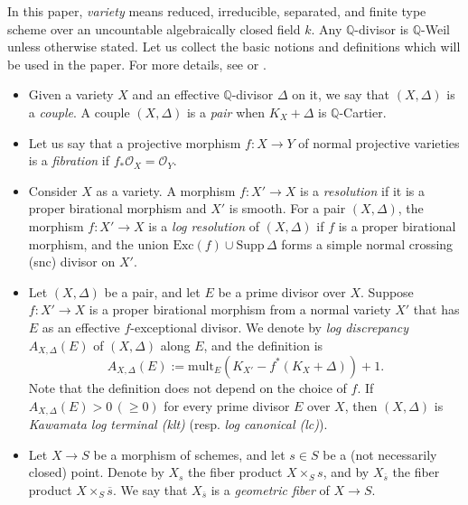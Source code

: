 \documentclass[a4paper,12pt]{amsart}
\theoremstyle{definition} %
\theoremstyle{remark}
\numberwithin{equation}{section}
\newcommand{\Q}{\mathbb{Q}}
\begin{document}
In this paper, \emph{variety} means reduced, irreducible, separated, and finite type scheme over an uncountable algebraically closed field $k$. Any $\Q$-divisor is $\Q$-Weil unless otherwise stated. Let us collect the basic notions and definitions which will be used in the paper. For more details, see \cite{KM98} or \cite{Fuj17}.

\begin{itemize}
\item Given a variety $X$ and an effective $\Q$-divisor $\Delta$ on it, we say that $(X,\Delta)$ is a \emph{couple}. A couple $(X,\Delta)$ is a \emph{pair} when $K_X+\Delta$ is $\Q$-Cartier.
\item Let us say that a projective morphism $f:X\to Y$ of normal projective varieties is a \emph{fibration} if $f_*\mathcal{O}_X=\mathcal{O}_Y$.
\item Consider $X$ as a variety. A morphism $f: X'\to X$ is a \emph{resolution} if it is a proper birational morphism and $X'$ is smooth. For a pair $(X, \Delta)$, the morphism $f:X'\to X$ is a \emph{log resolution} of $(X,\Delta)$ if $f$ is a proper birational morphism, and the union $\mathrm{Exc}(f) \cup \mathrm{Supp}\, \Delta$ forms a simple normal crossing (snc) divisor on $X'$.
\item Let $(X,\Delta)$ be a pair, and let $E$ be a prime divisor over $X$. Suppose $f:X'\to X$ is a proper birational morphism from a normal variety $X'$ that has $E$ as an effective $f$-exceptional divisor. We denote by \emph{log discrepancy} $A_{X,\Delta}(E)$ of $(X,\Delta)$ along $E$, and the definition is
    $$ A_{X,\Delta}(E):=\mathrm{mult}_E(K_{X'}-f^*(K_X+\Delta))+1.$$
    Note that the definition does not depend on the choice of $f$. If $A_{X,\Delta}(E)>0\,(\ge 0)$ for every prime divisor $E$ over $X$, then $(X,\Delta)$ is \emph{Kawamata log terminal (klt)} (resp. \emph{log canonical (lc)}).
    \item Let $X\to S$ be a morphism of schemes, and let $s\in S$ be a (not necessarily closed) point. Denote by $X_s$ the fiber product $X\times_S s$, and by $X_{\overline{s}}$ the fiber product $X\times_S \overline{s}$. We say that $X_{\overline{s}}$ is a \emph{geometric fiber} of $X\to S$.
\end{itemize}
\end{document}
